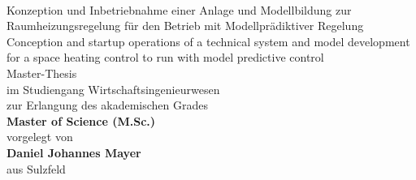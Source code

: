 %
%

\begin{titlepage}
   \mbox{}\\
   \rmfamily\huge
   \centering
	\rmfamily\mdseries\huge{Konzeption und Inbetriebnahme einer Anlage und Modellbildung zur Raumheizungsregelung für den Betrieb mit Modellprädiktiver Regelung}
   \vspace{1\baselineskip}\\
	\rmfamily\mdseries\upshape\normalsize{Conception and startup operations of a technical system and model development for a space heating control to run with model predictive control}
  \vspace{3\baselineskip}\\
   \rmfamily\mdseries\upshape\normalsize{
 Master-Thesis\\
im Studiengang Wirtschaftsingenieurwesen} 
  \vspace{2\baselineskip}\\
  \rmfamily\mdseries\upshape\normalsize{	
zur Erlangung des akademischen Grades\\
\textsf{\textbf{Master of Science (M.Sc.)}}}\\
   \vspace{3\baselineskip}
   \rmfamily\mdseries\upshape\normalsize{
   vorgelegt von\\
   \textsf{\textbf{Daniel Johannes Mayer}}\\
   aus Sulzfeld}
   \vspace{3\baselineskip}\\
\flushleft
\rmfamily\mdseries{}
   \vspace{3\baselineskip}\\
\centering\   \rmfamily\mdseries{}	   
\end{titlepage}


